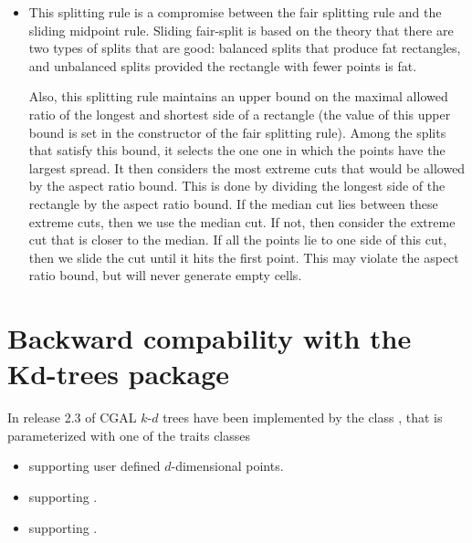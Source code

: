 \begin{itemize}
\item {}

This splitting rule is a compromise between the fair splitting rule
and the sliding midpoint rule.
Sliding fair-split is based on the theory that there are
two types of splits that are good: balanced splits that
produce fat rectangles, and unbalanced splits provided
the rectangle with fewer points is fat.

Also, this splitting rule maintains an upper
bound on the maximal allowed ratio of the longest and shortest side of
a rectangle (the value of this upper bound is set in the constructor of the
fair splitting rule). Among the splits that satisfy this bound, it selects
the one one in which the points have the largest spread.
It then considers the most extreme cuts that would be allowed by the
aspect ratio bound. This is done by dividing the longest side of
the rectangle by the aspect ratio bound. If the median cut lies
between these extreme cuts, then we use the median cut. If not,
then consider the extreme cut that is closer to the median.
If all the points lie to one side of this cut, then we slide the cut
until it hits the first point.
This may violate the aspect ratio bound, but will never generate empty cells.

\end{itemize}



\section{Backward compability with the Kd-trees package}
\label{Spatial_searching:Backward_compability_Kd-trees}

In release 2.3 of CGAL
$k$-$d$ trees have been implemented by the class , 
that is parameterized with one of the
traits classes 

\begin{itemize}

\item
{} supporting user defined $d$-dimensional points.

\item 
{} supporting . 

\item
{} supporting . 

\end{itemize}

